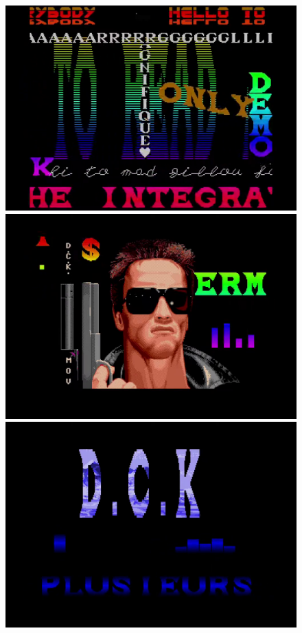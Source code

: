 \begin{figure}[h]
  \begin{minipage}[b]{0.30\linewidth}
    \centering
    \includegraphics[width=\linewidth]{images/demoscene/demos/dck00.png}
  \end{minipage}
  \hfill
  \begin{minipage}[b]{0.30\linewidth}
    \centering
    \includegraphics[width=\linewidth]{images/demoscene/demos/dck01.png}
  \end{minipage}
  \hfill
  \begin{minipage}[b]{0.30\linewidth}
    \centering
    \includegraphics[width=\linewidth]{images/demoscene/demos/dck02.png}

\end{minipage}
\end{figure}
